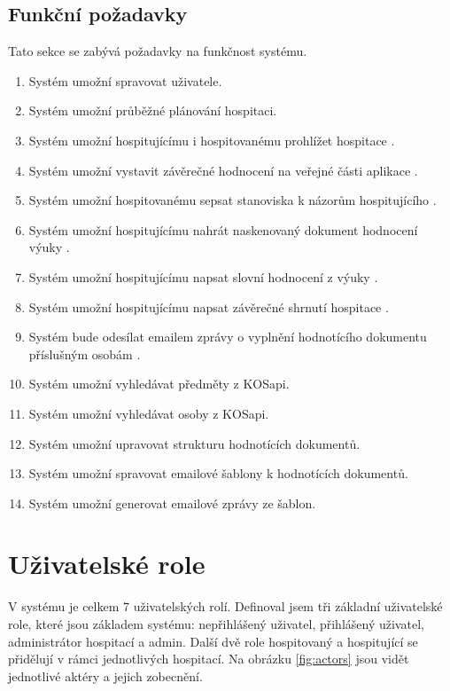 \subsection{Funkční požadavky}
Tato sekce se zabývá požadavky na funkčnost systému.
\begin{enumerate}
\item Systém umožní spravovat uživatele.
\item Systém umožní průběžné plánování hospitaci.
\item Systém umožní hospitujícímu i hospitovanému prohlížet hospitace \cite{prototyp_documentace}.
\item Systém umožní vystavit závěrečné hodnocení na veřejné části aplikace \cite{prototyp_documentace}. 
\item Systém umožní hospitovanému sepsat stanoviska k názorům hospitujícího \cite{prototyp_documentace}.
\item Systém umožní hospitujícímu nahrát naskenovaný dokument hodnocení výuky \cite{prototyp_documentace}.
\item Systém umožní hospitujícímu napsat slovní hodnocení z výuky \cite{prototyp_documentace}.
\item Systém umožní hospitujícímu napsat závěrečné shrnutí hospitace \cite{prototyp_documentace}.
\item Systém bude odesílat emailem zprávy o vyplnění hodnotícího dokumentu příslušným osobám \cite{prototyp_documentace}.
\item Systém umožní vyhledávat předměty z KOSapi.
\item Systém umožní vyhledávat osoby z KOSapi.
\item Systém umožní upravovat strukturu hodnotících dokumentů.
\item Systém umožní spravovat emailové šablony k hodnotících dokumentů.
\item Systém umožní generovat emailové zprávy ze šablon.
\end{enumerate}

\section{Uživatelské role}
V systému je celkem 7 uživatelských rolí. Definoval jsem tři základní uživatelské role, které jsou základem systému: nepřihlášený uživatel, přihlášený uživatel, administrátor hospitací a admin. Další dvě role hospitovaný a hospitující se přidělují v rámci jednotlivých hospitací. Na obrázku \ref{fig:actors} jsou vidět jednotlivé aktéry a jejich zobecnění.

